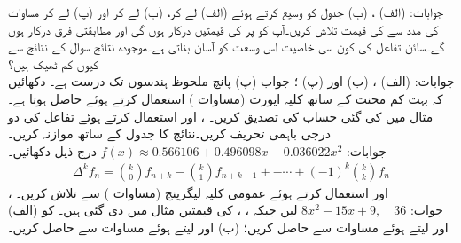 جوابات:\quad
(الف) ، (ب) 
\quad
جدول  کو وسیع کرتے ہوئے  (الف)  لے کر، (ب)  لے کر اور (پ)  لے کر   مساوات  کی مدد سے  کی قیمت تلاش کریں۔آپ کو  پر  کی قیمتیں درکار ہوں گی اور مطابقتی فرق  درکار ہوں گے۔سائن تفاعل کی کون سی خاصیت اس وسعت کو آسان بناتی ہے۔موجودہ نتائج سوال  کے نتائج سے کیوں کم ٹھیک ہیں؟\\
جوابات:\quad
(الف) ، (ب)  اور (پ) ؛ جواب (پ) پانچ ملحوظ ہندسوں تک درست ہے۔ 
\quad
دکھائیں کہ بہت کم محنت کے ساتھ کلیہ ایورٹ (مساوات ) استعمال کرتے ہوئے  حاصل ہوتا ہے۔
\quad
مثال  میں کی گئی حساب کی تصدیق کریں۔
\quad
{}،  اور  استعمال کرتے ہوئے  تفاعل   کی دو درجی باہمی تحریف کریں۔نتائج کا جدول   کے ساتھ موازنہ کریں۔ \\
جوابات:\quad
$f(x)\approx \num{0.566106}+\num{0.496098}x-\num{0.036022}x^2$
\quad
درج ذیل دکھائیں۔
\begin{align*}
\Delta^k f_n=\binom{k}{0}f_{n+k}-\binom{k}{1}f_{n+k-1}+-\cdots+(-1)^k\binom{k}{k}f_n
\end{align*}
\quad
{}،  اور  استعمال کرتے ہوئے 
عمومی کلیہ لیگرینج (مساوات ) سے   تلاش کریں۔ \\
جواب:\quad
$8x^2-15x+9,\quad 36$
\quad
{} لیں جبکہ ، ،  کی قیمتیں مثال  میں دی گئی ہیں۔  کو (الف)   اور  لیتے ہوئے مساوات   سے حاصل کریں؛ (ب)  اور  لیتے ہوئے مساوات  سے حاصل کریں۔
